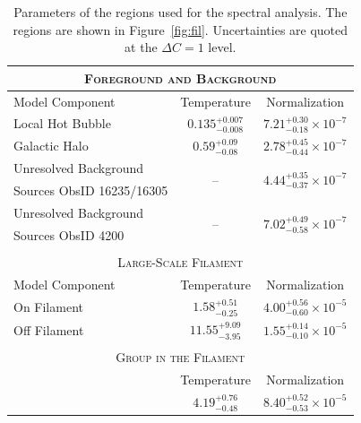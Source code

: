 \begin{table}
  \caption{Parameters of the regions used for the spectral analysis. The regions are shown in Figure~\ref{fig:fil}. Uncertainties are quoted at the $\Delta C = 1$ level. \label{tab:spectra}}
  \begin{center}
    \begin{threeparttable}
      \begin{tabular}{l c c}
              \multicolumn{3}{c}{\textsc{Foreground and Background}} \\
              \hline\hline
              Model Component & Temperature\tnote{a} & Normalization\tnote{b} \\
              \hline
              Local Hot Bubble & $0.135_{-0.008}^{+0.007}$ & $7.21_{-0.18}^{+0.30} \times 10^{-7}$ \\
              Galactic Halo & $0.59_{-0.08}^{+0.09}$ & $2.78_{-0.44}^{+0.45} \times 10^{-7}$ \\
              Unresolved Background       &\multirow{2}{*}{ -- } & \multirow{2}{*}{ $4.44_{-0.37}^{+0.35} \times 10^{-7}$} \\
              Sources ObsID 16235/16305 &                                    &            \\
              Unresolved Background       &\multirow{2}{*}{ -- } & \multirow{2}{*}{ $7.02_{-0.58}^{+0.49} \times 10^{-7}$} \\
              Sources ObsID 4200               &                                    &            \\
              \multicolumn{3}{c}{} \\
              \multicolumn{3}{c}{\textsc{Large-Scale Filament}} \\
              \hline\hline
                Model Component & Temperature\tnote{a} & Normalization\tnote{b} \\
              \hline
               On Filament & $1.58_{-0.25}^{+0.51}$ & $4.00_{-0.60}^{+0.56} \times 10^{-5}$ \\
               Off Filament & $11.55_{-3.95}^{+9.09}$ & $1.55_{-0.10}^{+0.14} \times 10^{-5}$  \\
               \multicolumn{3}{c}{} \\
              \multicolumn{3}{c}{\textsc{Group in the Filament}} \\
              \hline\hline
                             & Temperature\tnote{a} & Normalization\tnote{b} \\
              \hline
                            & $4.19_{-0.48}^{+0.76}$ & $ 8.40_{-0.53}^{+0.52} \times 10^{-5}$ \\

\end{tabular}
\end{threeparttable}
\end{center}
\end{table}

